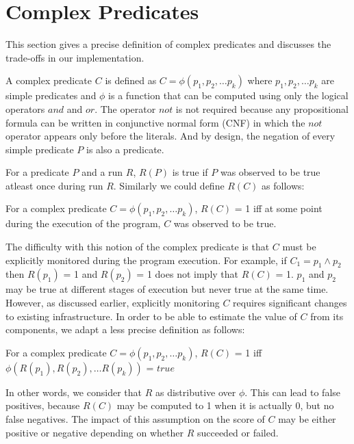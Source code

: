 \section{Complex Predicates}
\label{sec-complex-preds}
This section gives a precise definition of complex predicates and discusses the trade-offs in our implementation.

A complex predicate $C$ is defined as $C = \phi(p_1, p_2, \ldots p_k)$ where $p_1, p_2, \ldots p_k$ are simple predicates and $\phi$ is a function that can be computed using only the logical operators $and$ and $or$.  The operator $not$ is not required because any propositional formula can be written in conjunctive normal form (CNF) in which the $not$ operator appears only before the literals.  And by design, the negation of every simple predicate $P$ is also a predicate.

For a predicate $P$ and a run $R$, $R(P)$ is true if $P$ was observed to be true atleast once during run $R$.  Similarly we could define $R(C)$ as follows:
\begin{defn}
\label{dfn1}
For a complex predicate $C = \phi(p_1, p_2, \ldots p_k)$, $R(C)$ = 1 iff at some point during the execution of the program, $C$ was observed to be true.
\end{defn}

The difficulty with this notion of the complex predicate is that $C$ must be explicitly monitored during the program execution.  For example, if $C_1 = p_1 \wedge p_2$ then $R(p_1)$ = 1 and $R(p_2)$ = 1 does not imply that $R(C)$ = 1.  $p_1$ and $p_2$ may be true at different stages of execution but never true at the same time.  However, as discussed earlier, explicitly monitoring $C$ requires significant changes to existing infrastructure.  In order to be able to estimate the value of $C$ from its components, we adapt a less precise definition as follows:
\begin{defn}
\label{dfn1}
For a complex predicate $C = \phi(p_1, p_2, \ldots p_k)$, $R(C)$ = 1 iff $\phi(R(p_1), R(p_2), \ldots R(p_k))$ = $true$
\end{defn}

In other words, we consider that $R$ as distributive over $\phi$.  This can lead to false positives, because $R(C)$ may be computed to 1 when it is actually 0, but no false negatives.  The impact of this assumption on the score of $C$ may be either positive or negative depending on whether $R$ succeeded or failed.

